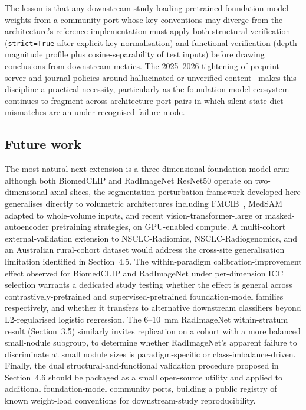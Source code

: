 The lesson is that any downstream study loading pretrained foundation-model weights from a community port whose key conventions may diverge from the architecture's reference implementation must apply both structural verification (\texttt{strict=True} after explicit key normalisation) and functional verification (depth-magnitude profile plus cosine-separability of test inputs) before drawing conclusions from downstream metrics. The 2025--2026 tightening of preprint-server and journal policies around hallucinated or unverified content~\cite{singh2026arxiv} makes this discipline a practical necessity, particularly as the foundation-model ecosystem continues to fragment across architecture-port pairs in which silent state-dict mismatches are an under-recognised failure mode.

\subsection{Future work}

The most natural next extension is a three-dimensional foundation-model arm: although both BiomedCLIP and RadImageNet ResNet50 operate on two-dimensional axial slices, the segmentation-perturbation framework developed here generalises directly to volumetric architectures including FMCIB~\cite{pai2024}, MedSAM~\cite{ma2024medsam} adapted to whole-volume inputs, and recent vision-transformer-large or masked-autoencoder pretraining strategies, on GPU-enabled compute. A multi-cohort external-validation extension to NSCLC-Radiomics, NSCLC-Radiogenomics, and an Australian rural-cohort dataset would address the cross-site generalisation limitation identified in Section~4.5. The within-paradigm calibration-improvement effect observed for BiomedCLIP and RadImageNet under per-dimension ICC selection warrants a dedicated study testing whether the effect is general across contrastively-pretrained and supervised-pretrained foundation-model families respectively, and whether it transfers to alternative downstream classifiers beyond L2-regularised logistic regression. The 6--10~mm RadImageNet within-stratum result (Section~3.5) similarly invites replication on a cohort with a more balanced small-nodule subgroup, to determine whether RadImageNet's apparent failure to discriminate at small nodule sizes is paradigm-specific or class-imbalance-driven. Finally, the dual structural-and-functional validation procedure proposed in Section~4.6 should be packaged as a small open-source utility and applied to additional foundation-model community ports, building a public registry of known weight-load conventions for downstream-study reproducibility.

